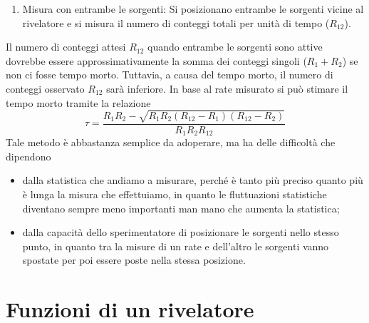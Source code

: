 \begin{esempio}
\begin{enumerate}[leftmargin=0.5cm]
      \item Misura con entrambe le sorgenti: Si posizionano entrambe le sorgenti vicine al rivelatore e si misura il numero di conteggi totali per unità di tempo ($R_{12}$).
   \end{enumerate}
   Il numero di conteggi attesi $R_{12}$ quando entrambe le sorgenti sono attive dovrebbe essere approssimativamente la somma dei conteggi singoli ($R_1 + R_2$) se non ci fosse tempo morto. Tuttavia, a causa del tempo morto, il numero di conteggi osservato $R_{12}$ sarà inferiore. In base al rate misurato si può stimare il tempo morto tramite la relazione
   \begin{equation*}
      \tau=\frac{R_1R_2 - \sqrt{R_1R_2( R_{12} - R_1 )( R_{12} - R_2 )}}{R_1R_2R_{12}}
   \end{equation*}
   Tale metodo è abbastanza semplice da adoperare, ma ha delle difficoltà che dipendono
   \begin{itemize}[leftmargin=0.5cm]
      \item dalla statistica che andiamo a misurare, perché è tanto più preciso quanto più è lunga la misura che effettuiamo, in quanto le fluttuazioni statistiche diventano sempre meno importanti man mano che aumenta la statistica;
      \item dalla capacità dello sperimentatore di posizionare le sorgenti nello stesso punto, in quanto tra la misure di un rate e dell'altro le sorgenti vanno spostate per poi essere poste nella stessa posizione.
   \end{itemize}
\end{esempio}

\section{Funzioni di un rivelatore}

